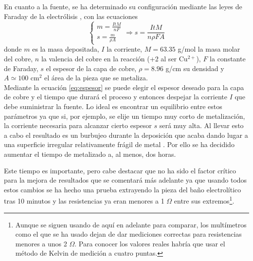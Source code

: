\documentclass[11pt,a4paper,twoside,pdf]{article}
\numberwithin{equation}{section}
\begin{document}
En cuanto a la fuente, se ha determinado su configuración mediante las leyes de Faraday de la electrólisis \cite{walsh}, con las ecuaciones
\begin{equation}\label{eq:espesor}
    \begin{cases}
        m = \frac{ItM}{nF}\\
        s = \frac{m}{\rho A}
    \end{cases} \Rightarrow
    s = \frac{ItM}{n\rho FA}
\end{equation}
donde $m$ es la masa depositada, $I$ la corriente, $M=63.35$ g/mol la masa molar del cobre, $n$ la valencia del cobre en la reacción (+2 al ser Cu$^{2+}$), $F$ la constante de Faraday, $s$ el espesor de la capa de cobre, $\rho=8.96$ g/cm su densidad y $A\simeq100$ cm$^2$ el área de la pieza que se metaliza.\\

Mediante la ecuación \ref{eq:espesor} se puede elegir el espesor deseado para la capa de cobre y el tiempo que durará el proceso y entonces despejar la corriente $I$ que debe suministrar la fuente. Lo ideal es encontrar un equilibrio entre estos parámetros ya que si, por ejemplo, se elije un tiempo muy corto de metalización, la corriente necesaria para alcanzar cierto espesor $s$ será muy alta. Al llevar esto a cabo el resultado es un burbujeo durante la deposición que acaba dando lugar a una superficie irregular relativamente frágil de metal \cite{hen3drik}. Por ello se ha decidido aumentar el tiempo de metalizado a, al menos, dos horas.

Este tiempo es importante, pero cabe destacar que no ha sido el factor crítico para la mejora de resultados que se comentará más adelante ya que usando todos estos cambios se ha hecho una prueba extrayendo la pieza del baño electrolítico tras 10 minutos y las resistencias ya eran menores a 1 $\Omega$ entre sus extremos\footnote{Aunque se siguen usando de aquí en adelante para comparar, los multímetros como el que se ha usado dejan de dar mediciones correctas para resistencias menores a unos 2 $\Omega$. Para conocer los valores reales habría que usar el método de Kelvin de medición a cuatro puntas.}.
\end{document}
